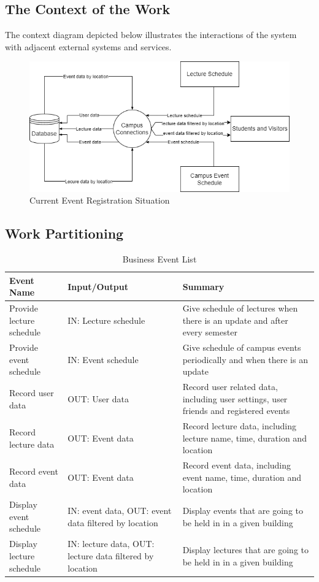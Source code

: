 \documentclass[12pt]{article}
\begin{document}
\subsection{The Context of the Work}

The context diagram depicted below illustrates the interactions of the system with adjacent external systems and services.
\begin{figure}[H]
\begin{center}
\includegraphics[scale=0.7]{Context_Diagram.png}
\end{center}
\caption{Current Event Registration Situation}
\end{figure}

\subsection{Work Partitioning}

\begin{table}[H]
  \caption{Business Event List} \label{TblEventList}
  \begin{tabular}{p{} | p{} | p{}}
  \toprule
  \textbf{Event Name} & \textbf{Input/Output} & \textbf{Summary}\\
  \midrule
  Provide lecture schedule & IN: Lecture schedule & Give schedule of lectures when there is an update and after every semester\\
  \midrule
  Provide event schedule & IN: Event schedule & Give schedule of campus events periodically and when there is an update\\
  \midrule
  Record user data & OUT: User data & Record user related data, including user settings, user friends and registered events\\
  \midrule
  Record lecture data & OUT: Event data & Record lecture data, including lecture name,  time, duration and location\\
  \midrule
    Record event data & OUT: Event data & Record event data, including event name,  time,  duration and location\\
  \midrule
  Display event schedule & IN: event data, OUT: event data filtered by location & Display events that are going to be held in in a given building\\
  \midrule
  Display lecture schedule & IN: lecture data, OUT: lecture data filtered by location & Display lectures that are going to be held in in a given building\\
  \bottomrule
\end{tabular}
\end{table}
\end{document}
